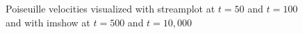 \documentclass[a4paper,11pt, oneside]{book}
\begin{document}
\begin{figure}[ht]
\centering
\resizebox{0.7\columnwidth}{!}{\large}
\caption[Poiseuille Velocities]{Poiseuille velocities visualized with streamplot at $t=50$ and $t=100$ and with imshow at $t=500$ and $t=10,000$ }
\label{fig:m5-1-num-theo}
\end{figure}






% 
\end{document}
